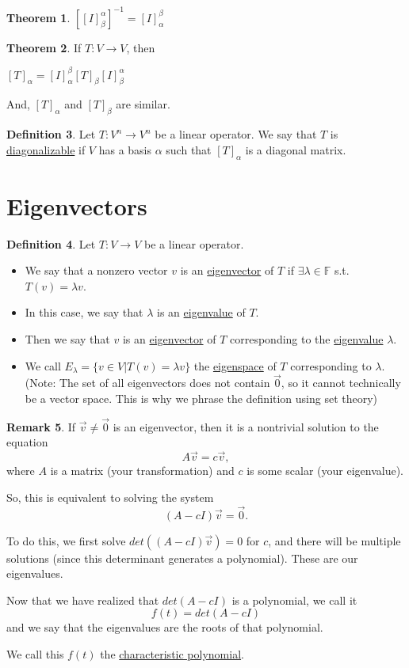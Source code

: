 \documentclass[a5paper]{article}
\theoremstyle{definition}%
\newtheorem{theorem}{Theorem}
\numberwithin{theorem}{section} %
\newtheorem{definition}[theorem]{Definition}
\newtheorem{remark}[theorem]{Remark}
\newcommand{\F}{\mathbb{F}}
\begin{document}
\begin{theorem}
$\left[ [I]_\beta^\alpha \right]^{-1} = [I]_\alpha^\beta$
\end{theorem}

\begin{theorem}
If $T:V \to V$, then 

$[T]_\alpha = [I]_\alpha^\beta [T]_\beta [I]_\beta^\alpha$

And, $[T]_\alpha$ and $[T]_\beta$ are similar. 
\end{theorem}

\begin{definition}
Let $T:V^n \to V^n$ be a linear operator. We say that $T$ is \underline{diagonalizable} if $V$ has a basis $\alpha$ such that $[T]_\alpha$ is a diagonal matrix. 
\end{definition}

\section{Eigenvectors}

\begin{definition}
Let $T:V \to V$ be a linear operator. 
\begin{itemize}
\item We say that a nonzero vector $v$ is an \underline{eigenvector} of $T$ if $\exists	\lambda \in \F$ s.t. $T(v) = \lambda v$. 
\item In this case, we say that $\lambda$ is an \underline{eigenvalue} of $T$.
\item Then we say that $v$ is an \underline{eigenvector} of $T$ corresponding to the \underline{eigenvalue} $\lambda$. 
\item We call $E_\lambda = \{v \in V | T(v)=\lambda v\}$ the \underline{eigenspace} of $T$ corresponding to $\lambda$. (Note: The set of all eigenvectors does not contain $\vec{0}$, so it cannot technically be a vector space. This is why we phrase the definition using set theory)
\end{itemize} 

\end{definition}

\begin{remark}
If $\vec{v}\neq\vec{0}$ is an eigenvector, then it is a nontrivial solution to the equation $$A\vec{v}=c\vec{v},$$ where $A$ is a matrix (your transformation) and $c$ is some scalar (your eigenvalue). 

So, this is equivalent to solving the system $$(A-cI)\vec{v}=\vec{0}.$$

To do this, we first solve $det((A-cI)\vec{v})=0$ for $c$, and there will be multiple solutions (since this determinant generates a polynomial). These are our eigenvalues. 

Now that we have realized that $det(A-cI)$ is a polynomial, we call it $$f(t) = det(A-cI)$$ and we say that the eigenvalues are the roots of that polynomial.

We call this $f(t)$ the \underline{characteristic polynomial}.
\end{remark}
\end{document}
